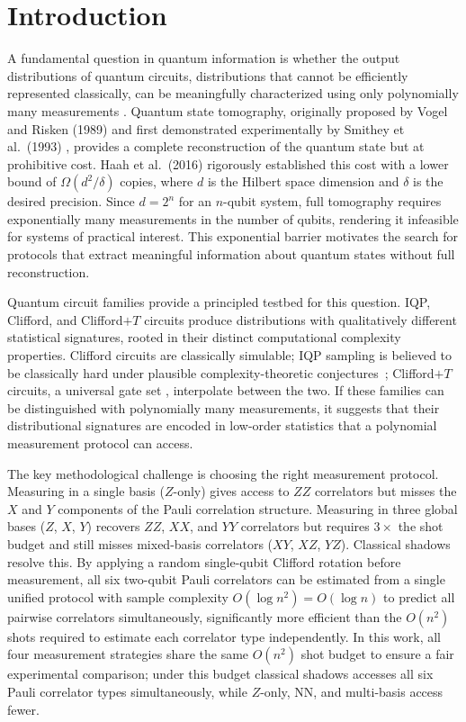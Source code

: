 \documentclass[conference]{IEEEtran}
\newcommand{\nqubits}{n}
\begin{document}
\section{Introduction}
\label{sec:intro}

A fundamental question in quantum information is whether the output distributions of quantum circuits, distributions that cannot be efficiently represented classically, can be meaningfully characterized using only polynomially many measurements \cite{montanaro2013survey}. 
Quantum state tomography, originally proposed by Vogel and Risken (1989) \cite{vogel1989determination} and first demonstrated experimentally by Smithey et al.\ (1993) \cite{smithey1993measurement}, provides a complete reconstruction of the quantum state but at prohibitive cost. 
Haah et al.\ (2016) \cite{haah2016sample} rigorously established this cost with a lower bound of $\Omega(d^2/\delta)$ copies, where $d$ is the Hilbert space dimension and $\delta$ is the desired precision. 
Since $d = 2^n$ for an $n$-qubit system, full tomography requires exponentially many measurements in the number of qubits, rendering it infeasible for systems of practical interest. 
This exponential barrier motivates the search for protocols that extract meaningful information about quantum states without full reconstruction.

Quantum circuit families provide a principled testbed for this question.
IQP, Clifford, and Clifford$+T$ circuits produce distributions with qualitatively different statistical signatures, rooted in their distinct computational complexity properties.
Clifford circuits are classically simulable; IQP sampling is believed to be classically hard under plausible complexity-theoretic conjectures~\cite{bremner2016average}; Clifford$+T$ circuits, a universal gate set \cite{boykin1999universal, bravyi2005universal}, interpolate between the two.
If these families can be distinguished with polynomially many measurements, it suggests that their distributional signatures are encoded in low-order statistics that a polynomial measurement protocol can access.

The key methodological challenge is choosing the right measurement protocol.
Measuring in a single basis ($Z$-only) gives access to $ZZ$ correlators but misses the $X$ and $Y$ components of the Pauli correlation structure.
Measuring in three global bases ($Z$, $X$, $Y$) recovers $ZZ$, $XX$, and $YY$ correlators but requires $3\times$ the shot budget and still misses mixed-basis correlators ($XY$, $XZ$, $YZ$).
Classical shadows resolve this. By applying a random single-qubit Clifford rotation before measurement, all six 
two-qubit Pauli correlators can be estimated from a single unified protocol with sample complexity 
$O(\log n^2) = O(\log n)$ to predict all pairwise correlators simultaneously, significantly more efficient 
than the $O(n^2)$ shots required to estimate each correlator type independently.
In this work, all four measurement strategies share the same $O(\nqubits^2)$ shot budget to ensure a fair experimental comparison; under this budget classical shadows accesses all six Pauli correlator types simultaneously, while $Z$-only, NN, and multi-basis access fewer.
\end{document}
